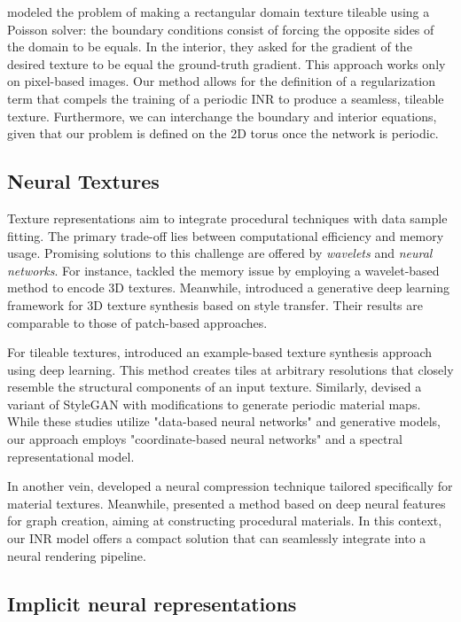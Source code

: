 \citet{perez2003} modeled the problem of making a rectangular domain texture tileable using a Poisson solver: the boundary conditions consist of forcing the opposite sides of the domain to be equals. In the interior, they asked for the gradient of the desired texture to be equal the ground-truth gradient. This approach works only on pixel-based images. Our method allows for the definition of a regularization term that compels the training of a periodic INR to produce a seamless, tileable texture. Furthermore, we can interchange the boundary and interior equations, given that our problem is defined on the 2D torus once the network is periodic.


\subsection{Neural Textures}

Texture representations aim to integrate procedural techniques with data sample fitting. The primary trade-off lies between computational efficiency and memory usage. Promising solutions to this challenge are offered by \emph{wavelets} and \emph{neural networks}. For instance, \citet{BAJAJ-2000} tackled the memory issue by employing a wavelet-based method to encode 3D textures. Meanwhile, \citet{Gutierrez-2019} introduced a generative deep learning framework for 3D texture synthesis based on style transfer. Their results are comparable to those of patch-based approaches.



For tileable textures, \citet{deeptile} introduced an example-based texture synthesis approach using deep learning. This method creates tiles at arbitrary resolutions that closely resemble the structural components of an input texture. Similarly, \citet{zhou2022tilegen} devised a variant of StyleGAN with modifications to generate periodic material maps. While these studies utilize "data-based neural networks" and generative models, our approach employs "coordinate-based neural networks" and a spectral representational model.

In another vein, \citet{ntc2023} developed a neural compression technique tailored specifically for material textures. Meanwhile, \citet{match} presented a method based on deep neural features for graph creation, aiming at constructing procedural materials. In this context, our INR model offers a compact solution that can seamlessly integrate into a neural rendering pipeline.

\subsection{Implicit neural representations}

